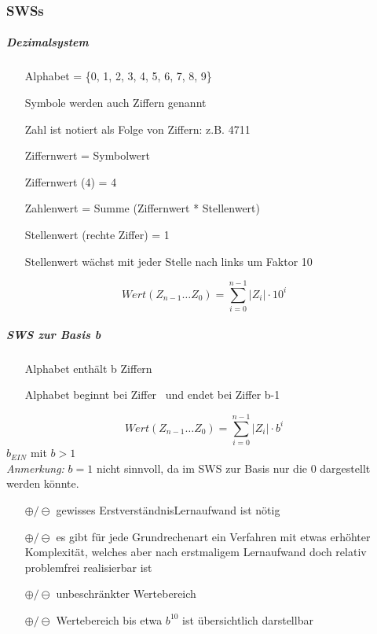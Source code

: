\documentclass[10pt,a4paper]{scrartcl}
\begin{document}
	\subsubsection{\acfp{SWS}}
	\subparagraph{Dezimalsystem}
	\begin{itemize}
		\item[] Alphabet = \{0, 1, 2, 3, 4, 5, 6, 7, 8, 9\}
		\item[] Symbole werden auch Ziffern genannt
		\item[] Zahl ist notiert als Folge von Ziffern: z.B. 4711
		\item[] Ziffernwert = Symbolwert
		\item[] Ziffernwert (4) = 4
		\item[] Zahlenwert = Summe (Ziffernwert * Stellenwert) 
		\item[] Stellenwert (rechte Ziffer) = 1  
		\item[]Stellenwert wächst mit jeder Stelle nach links um Faktor 10
	\end{itemize}
	$$
	Wert(Z_{n-1} \dots Z_0) = \sum_{i=0}^{n-1}|Z_i|\cdot10^i
	$$
	\subparagraph{\acl{SWS} zur Basis b}
	\begin{itemize}
		\item[] Alphabet enthält b Ziffern
		\item[] Alphabet beginnt bei Ziffer \grqq\ und endet bei Ziffer \glqq b-1\grqq\
	\end{itemize} 
	$$
		Wert(Z_{n-1} \dots Z_0) = \sum_{i=0}^{n-1}|Z_i| \cdot b^i
	$$
	$b_{EIN}$ mit $b>1$\\
	\textit{Anmerkung:} $b=1$ nicht sinnvoll, da im \ac{SWS} zur Basis nur die 0 dargestellt werden könnte.
	\begin{itemize}
		\item[$ \oplus/\ominus $] gewisses \glqq Erstverständnis\grqq\/Lernaufwand ist nötig
		\item[$ \oplus/\ominus $] es gibt für jede Grundrechenart ein Verfahren mit etwas erhöhter Komplexität, welches aber nach erstmaligem Lernaufwand doch relativ problemfrei realisierbar ist
		\item[$ \oplus/\ominus $] unbeschränkter Wertebereich
		\item[$ \oplus/\ominus $] Wertebereich bis etwa $b^10$ ist übersichtlich darstellbar
	\end{itemize}
\end{document}
